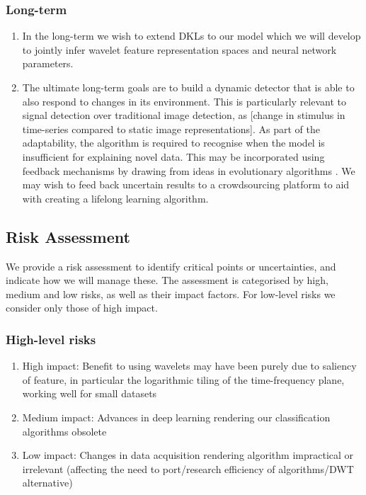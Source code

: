 \documentclass[12pt]{llncs}
\begin{document}
\subsubsection{Long-term}
\begin{enumerate}
	\item In the long-term we wish to extend DKLs to our model which we will develop to jointly infer wavelet feature representation spaces and neural network parameters.
	\item The ultimate long-term goals are to build a dynamic detector that is able to also respond to changes in its environment. This is particularly relevant to signal detection over traditional image detection, as [change in stimulus in time-series compared to static image representations]. As part of the adaptability, the algorithm is required to recognise when the model is insufficient for explaining novel data. This may be incorporated using feedback mechanisms by drawing from ideas in evolutionary algorithms \cite{coello2007evolutionary}. We may wish to feed back uncertain results to a crowdsourcing platform to aid with creating a lifelong learning algorithm.
\end{enumerate}



\subsection{Risk Assessment}
We provide a risk assessment to identify critical points or uncertainties, and indicate how we will manage these. The assessment is categorised by high, medium and low risks, as well as their impact factors. For low-level risks we consider only those of high impact.

\subsubsection{High-level risks} 
\begin{enumerate} 
\item High impact: Benefit to using wavelets may have been purely due to saliency of feature, in particular the logarithmic tiling of the time-frequency plane, working well for small datasets
\item Medium impact: Advances in deep learning rendering our classification algorithms obsolete
\label{bullet:highrisk2}
\item Low impact: Changes in data acquisition rendering algorithm impractical or irrelevant (affecting the need to port/research efficiency of algorithms/DWT alternative)


\end{enumerate}
\end{document}
